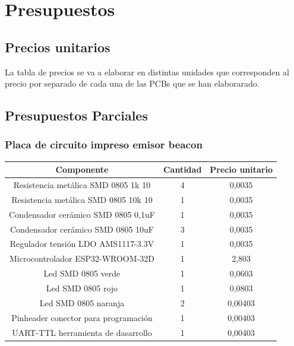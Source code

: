 \documentclass[a4paper ,12pt, onecolumn]{article}
\begin{document}
        \section{Presupuestos}
        \subsection{Precios unitarios}
        La tabla de precios se va a elaborar en distintas unidades que corresponden al precio por separado de cada
        una de las PCBs que se han elaborarado.
        \subsection{Presupuestos Parciales}
            \subsubsection{Placa de circuito impreso emisor beacon}
                \begin{center}
                    \begin{tabular}{||c | c |c ||} 
                    \hline
                    Componente & Cantidad & Precio unitario  \\ [0.5ex] 
                    \hline\hline
                    Resistencia metálica SMD 0805 1k 10 & 4 & 0,0035 \\ 
                    Resistencia metálica SMD 0805 10k 10  & 1 & 0,0035 \\ 
                    Condensador cerámico SMD 0805 0,1uF  & 1 & 0,0035 \\ 
                    Condensador cerámico SMD 0805 10uF  & 3 & 0,0035 \\ 
                    Regulador tensión LDO AMS1117-3.3V  & 1 & 0,0035 \\ 
                    Microcontrolador ESP32-WROOM-32D   & 1 & 2,803 \\ 
                    Led SMD 0805 verde& 1 & 0,0603 \\ 
                    Led SMD 0805 rojo& 1 & 0,0803 \\ 
                    Led SMD 0805 naranja & 2 & 0,00403 \\ 
                    Pinheader conector para programación & 1 & 0,00403 \\ 
                    UART-TTL herramienta de dasarrollo & 1 & 0,00403 \\ 
                \hline
                    \end{tabular}
                \end{center}
\end{document}
